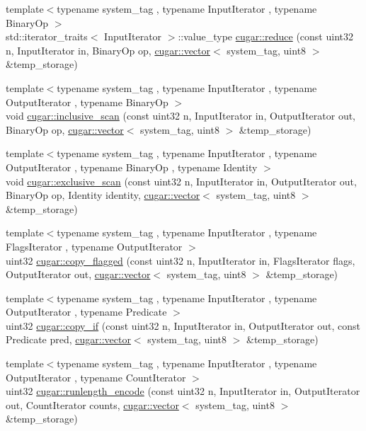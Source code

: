 \begin{DoxyCompactItemize}
\item 
{\footnotesize template$<$typename system\+\_\+tag , typename Input\+Iterator , typename Binary\+Op $>$ }\\std\+::iterator\+\_\+traits$<$ Input\+Iterator $>$\+::value\+\_\+type \hyperlink{group___primitives_gab8f49b135164aaef1fb6b51b90874915}{cugar\+::reduce} (const uint32 n, Input\+Iterator in, Binary\+Op op, \hyperlink{structcugar_1_1vector}{cugar\+::vector}$<$ system\+\_\+tag, uint8 $>$ \&temp\+\_\+storage)
\item 
{\footnotesize template$<$typename system\+\_\+tag , typename Input\+Iterator , typename Output\+Iterator , typename Binary\+Op $>$ }\\void \hyperlink{group___primitives_ga6c5ea5be5565ce7aa2c99b3e602a7cb7}{cugar\+::inclusive\+\_\+scan} (const uint32 n, Input\+Iterator in, Output\+Iterator out, Binary\+Op op, \hyperlink{structcugar_1_1vector}{cugar\+::vector}$<$ system\+\_\+tag, uint8 $>$ \&temp\+\_\+storage)
\item 
{\footnotesize template$<$typename system\+\_\+tag , typename Input\+Iterator , typename Output\+Iterator , typename Binary\+Op , typename Identity $>$ }\\void \hyperlink{group___primitives_ga1394066fd7b6215bcae781ca56cae872}{cugar\+::exclusive\+\_\+scan} (const uint32 n, Input\+Iterator in, Output\+Iterator out, Binary\+Op op, Identity identity, \hyperlink{structcugar_1_1vector}{cugar\+::vector}$<$ system\+\_\+tag, uint8 $>$ \&temp\+\_\+storage)
\item 
{\footnotesize template$<$typename system\+\_\+tag , typename Input\+Iterator , typename Flags\+Iterator , typename Output\+Iterator $>$ }\\uint32 \hyperlink{group___primitives_gaafc4aac8b44cf750c98a3a97fe72e5c6}{cugar\+::copy\+\_\+flagged} (const uint32 n, Input\+Iterator in, Flags\+Iterator flags, Output\+Iterator out, \hyperlink{structcugar_1_1vector}{cugar\+::vector}$<$ system\+\_\+tag, uint8 $>$ \&temp\+\_\+storage)
\item 
{\footnotesize template$<$typename system\+\_\+tag , typename Input\+Iterator , typename Output\+Iterator , typename Predicate $>$ }\\uint32 \hyperlink{group___primitives_ga536856eaa09125bec01892d565a49f8e}{cugar\+::copy\+\_\+if} (const uint32 n, Input\+Iterator in, Output\+Iterator out, const Predicate pred, \hyperlink{structcugar_1_1vector}{cugar\+::vector}$<$ system\+\_\+tag, uint8 $>$ \&temp\+\_\+storage)
\item 
{\footnotesize template$<$typename system\+\_\+tag , typename Input\+Iterator , typename Output\+Iterator , typename Count\+Iterator $>$ }\\uint32 \hyperlink{group___primitives_gae48c0c95572ea1dd13ec562eed6e2755}{cugar\+::runlength\+\_\+encode} (const uint32 n, Input\+Iterator in, Output\+Iterator out, Count\+Iterator counts, \hyperlink{structcugar_1_1vector}{cugar\+::vector}$<$ system\+\_\+tag, uint8 $>$ \&temp\+\_\+storage)

\end{DoxyCompactItemize}
